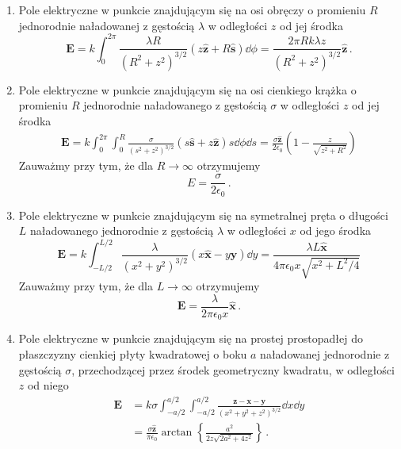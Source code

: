 \documentclass[../main.tex]{subfiles}
\begin{document}
\begin{enumerate}
    \item Pole elektryczne w punkcie znajdującym się na osi obręczy o promieniu \(R\) jednorodnie naładowanej z gęstością \(\lambda\) w odległości \(z\) od jej środka
    \begin{equation*}
        \mathbf{E}=k\int_0^{2\pi} \frac{\lambda R}{(R^2+z^2)^{3/2}}(z\mathbf{\hat{z}}+R\mathbf{\hat{s}})\dd{\phi}=\frac{2\pi Rk\lambda z}{(R^2+z^2)^{3/2}}\mathbf{\hat{z}}\,.
    \end{equation*}
    
    \item Pole elektryczne w punkcie znajdującym się na osi cienkiego krążka o promieniu \(R\) jednorodnie naładowanego z gęstością \(\sigma\) w odległości \(z\) od jej środka
    \begin{equation*}
    \begin{split}
        \mathbf{E}=k\int_0^{2\pi}\int_0^R\frac{\sigma }{(s^2+z^2)^{3/2}}(s\mathbf{\hat{s}}+z\mathbf{\hat{z}})s\dd{\phi}\dd{s}=\frac{\sigma\mathbf{\hat{z}}}{2\epsilon_0}\left(1-\frac{z}{\sqrt{z^2+R^2}}\right)
    \end{split}
    \end{equation*}
    Zauważmy przy tym, że dla \(R\to\infty\) otrzymujemy
    \begin{equation*}
        E=\frac{\sigma}{2\epsilon_0}\,.
    \end{equation*}
    \item Pole elektryczne w punkcie znajdującym się na symetralnej pręta o długości \(L\) naładowanego jednorodnie z gęstością \(\lambda\) w odległości \(x\) od jego środka
    \begin{equation*}
        \mathbf{E}=k\int_{-L/2}^{L/2}\frac{\lambda}{(x^2+y^2)^{3/2}}(x\mathbf{\hat{x}}-y\mathbf{\hat{y}})\dd{y}=\frac{\lambda L\mathbf{\hat{x}}}{4\pi\epsilon_0x\sqrt{x^2+L^2/4}}
    \end{equation*}
    Zauważmy przy tym, że dla \(L\to\infty\) otrzymujemy
    \begin{equation*}
        \mathbf{E}=\frac{\lambda}{2\pi\epsilon_0x}\mathbf{\hat{x}}\,.
    \end{equation*}
    
    \item Pole elektryczne w punkcie znajdującym się na prostej prostopadłej do płaszczyzny cienkiej płyty kwadratowej o boku \(a\) naładowanej jednorodnie z gęstością \(\sigma\), przechodzącej przez środek geometryczny kwadratu, w odległości \(z\) od niego
    \begin{equation*}
    \begin{split}
        \mathbf{E}&=k\sigma \int_{-a/2}^{a/2}\int_{-a/2}^{a/2}\frac{\mathbf{z}-\mathbf{x}-\mathbf{y}}{(x^2+y^2+z^2)^{3/2}}\dd{x}\dd{y}\\
        &=\frac{\sigma \mathbf{\hat{z}}}{\pi\epsilon_0}\arctan\left\{\frac{a^2}{2z\sqrt{2a^2+4z^2}}\right\}\,.
    \end{split}
    \end{equation*}
\end{enumerate}
\end{document}
